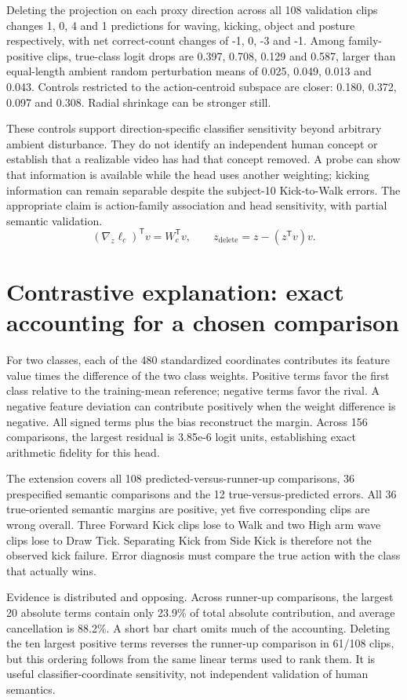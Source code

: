 \documentclass[11pt]{article}
\begin{document}
Deleting the projection on each proxy direction across all 108 validation clips changes 1, 0, 4 and 1 predictions for waving, kicking, object and posture respectively, with net correct-count changes of -1, 0, -3 and -1. Among family-positive clips, true-class logit drops are 0.397, 0.708, 0.129 and 0.587, larger than equal-length ambient random perturbation means of 0.025, 0.049, 0.013 and 0.043. Controls restricted to the action-centroid subspace are closer: 0.180, 0.372, 0.097 and 0.308. Radial shrinkage can be stronger still.

These controls support direction-specific classifier sensitivity beyond arbitrary ambient disturbance. They do not identify an independent human concept or establish that a realizable video has had that concept removed. A probe can show that information is available while the head uses another weighting; kicking information can remain separable despite the subject-10 Kick-to-Walk errors. The appropriate claim is action-family association and head sensitivity, with partial semantic validation.
\[\left(\nabla_z\ell_c\right)^{\mathsf T}v=W_c^{\mathsf T}v,\qquad z_{\mathrm{delete}}=z-(z^{\mathsf T}v)v.\]

\section{Contrastive explanation: exact accounting for a chosen comparison}
For two classes, each of the 480 standardized coordinates contributes its feature value times the difference of the two class weights. Positive terms favor the first class relative to the training-mean reference; negative terms favor the rival. A negative feature deviation can contribute positively when the weight difference is negative. All signed terms plus the bias reconstruct the margin. Across 156 comparisons, the largest residual is 3.85e-6 logit units, establishing exact arithmetic fidelity for this head.

The extension covers all 108 predicted-versus-runner-up comparisons, 36 prespecified semantic comparisons and the 12 true-versus-predicted errors. All 36 true-oriented semantic margins are positive, yet five corresponding clips are wrong overall. Three Forward Kick clips lose to Walk and two High arm wave clips lose to Draw Tick. Separating Kick from Side Kick is therefore not the observed kick failure. Error diagnosis must compare the true action with the class that actually wins.

Evidence is distributed and opposing. Across runner-up comparisons, the largest 20 absolute terms contain only 23.9\% of total absolute contribution, and average cancellation is 88.2\%. A short bar chart omits much of the accounting. Deleting the ten largest positive terms reverses the runner-up comparison in 61/108 clips, but this ordering follows from the same linear terms used to rank them. It is useful classifier-coordinate sensitivity, not independent validation of human semantics.
\end{document}
